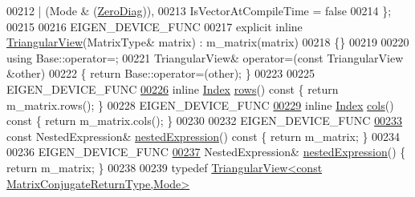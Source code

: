 \begin{DoxyCode}
00212                     | (Mode & (\hyperlink{group__enums_gga39e3366ff5554d731e7dc8bb642f83cda884ff7240392e85aa6e4b3c957e36483}{ZeroDiag})),
00213       IsVectorAtCompileTime = \textcolor{keyword}{false}
00214     \};
00215 
00216     EIGEN\_DEVICE\_FUNC
00217     \textcolor{keyword}{explicit} \textcolor{keyword}{inline} \hyperlink{group___core___module_class_eigen_1_1_triangular_view}{TriangularView}(MatrixType& matrix) : m\_matrix(matrix)
00218     \{\}
00219     
00220     \textcolor{keyword}{using} Base::operator=;
00221     TriangularView& operator=(\textcolor{keyword}{const} TriangularView &other)
00222     \{ \textcolor{keywordflow}{return} Base::operator=(other); \}
00223 
00225     EIGEN\_DEVICE\_FUNC
\hyperlink{group___core___module_a34de9aa9961062ff65f24bbeaef4e693}{00226}     \textcolor{keyword}{inline} \hyperlink{namespace_eigen_a62e77e0933482dafde8fe197d9a2cfde}{Index} \hyperlink{group___core___module_a34de9aa9961062ff65f24bbeaef4e693}{rows}()\textcolor{keyword}{ const }\{ \textcolor{keywordflow}{return} m\_matrix.rows(); \}
00228     EIGEN\_DEVICE\_FUNC
\hyperlink{group___core___module_ae0a22563fd472eca7aaf9bc5f29d2898}{00229}     \textcolor{keyword}{inline} \hyperlink{namespace_eigen_a62e77e0933482dafde8fe197d9a2cfde}{Index} \hyperlink{group___core___module_ae0a22563fd472eca7aaf9bc5f29d2898}{cols}()\textcolor{keyword}{ const }\{ \textcolor{keywordflow}{return} m\_matrix.cols(); \}
00230 
00232     EIGEN\_DEVICE\_FUNC
\hyperlink{group___core___module_a83b7cdd9d9ea543a3c893fc2e74d8fbb}{00233}     \textcolor{keyword}{const} NestedExpression& \hyperlink{group___core___module_a83b7cdd9d9ea543a3c893fc2e74d8fbb}{nestedExpression}()\textcolor{keyword}{ const }\{ \textcolor{keywordflow}{return} m\_matrix; \}
00234 
00236     EIGEN\_DEVICE\_FUNC
\hyperlink{group___core___module_a62e7446cc39a920b8b59eb02380abc4b}{00237}     NestedExpression& \hyperlink{group___core___module_a62e7446cc39a920b8b59eb02380abc4b}{nestedExpression}() \{ \textcolor{keywordflow}{return} m\_matrix; \}
00238     
00239     \textcolor{keyword}{typedef} \hyperlink{group___core___module_class_eigen_1_1_triangular_view}{TriangularView<const MatrixConjugateReturnType,Mode>}

\end{DoxyCode}
